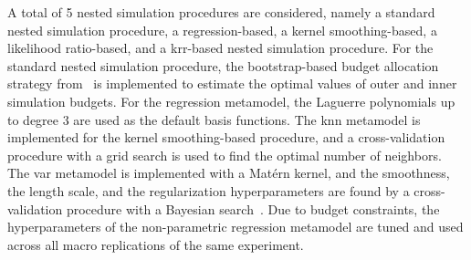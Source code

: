 A total of 5 nested simulation procedures are considered, namely a standard nested simulation procedure, a  regression-based, a kernel smoothing-based, a likelihood ratio-based, and a \gls{krr}-based nested simulation procedure.
For the standard nested simulation procedure, the bootstrap-based budget allocation strategy from~\cite{zhang2021bootstrap} is implemented to estimate the optimal values of outer and inner simulation budgets.
For the regression metamodel, the Laguerre polynomials up to degree $3$ are used as the default basis functions.
The \gls{knn} metamodel is implemented for the kernel smoothing-based procedure, and a cross-validation procedure with a grid search is used to find the optimal number of neighbors.
The \gls{var} metamodel is implemented with a Mat\'ern kernel, and the smoothness, the length scale, and the regularization hyperparameters are found by a cross-validation procedure with a Bayesian search~\citep{frazier2018bayesian}.
Due to budget constraints, the hyperparameters of the non-parametric regression metamodel are tuned and used across all macro replications of the same experiment.

